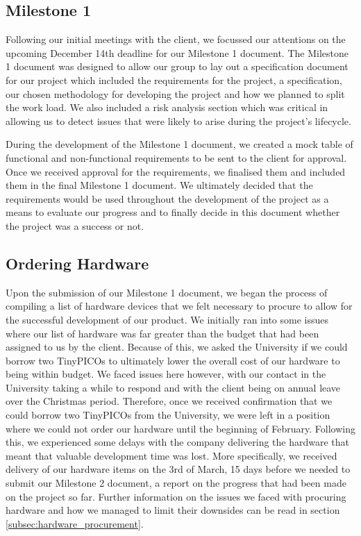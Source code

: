         \subsection{Milestone 1}

            Following our initial meetings with the client, we focussed our attentions on the upcoming December 14th deadline for our Milestone 1 document. The Milestone 1 document was designed to allow our group to lay out a specification document for our project which included the requirements for the project, a specification, our chosen methodology for developing the project and how we planned to split the work load. We also included a risk analysis section which was critical in allowing us to detect issues that were likely to arise during the project's lifecycle. 

            During the development of the Milestone 1 document, we created a mock table of functional and non-functional requirements to be sent to the client for approval. Once we received approval for the requirements, we finalised them and included them in the final Milestone 1 document. We ultimately decided that the requirements would be used throughout the development of the project as a means to evaluate our progress and to finally decide in this document whether the project was a success or not.

        \subsection{Ordering Hardware}

            Upon the submission of our Milestone 1 document, we began the process of compiling a list of hardware devices that we felt necessary to procure to allow for the successful development of our product. We initially ran into some issues where our list of hardware was far greater than the budget that had been assigned to us by the client. Because of this, we asked the University if we could borrow two TinyPICOs to ultimately lower the overall cost of our hardware to being within budget. We faced issues here however, with our contact in the University taking a while to respond and with the client being on annual leave over the Christmas period. Therefore, once we received confirmation that we could borrow two TinyPICOs from the University, we were left in a position where we could not order our hardware until the beginning of February. Following this, we experienced some delays with the company delivering the hardware that meant that valuable development time was lost. More specifically, we received delivery of our hardware items on the 3rd of March, 15 days before we needed to submit our Milestone 2 document, a report on the progress that had been made on the project so far. Further information on the issues we faced with procuring hardware and how we managed to limit their downsides can be read in section \ref{subsec:hardware_procurement}.

